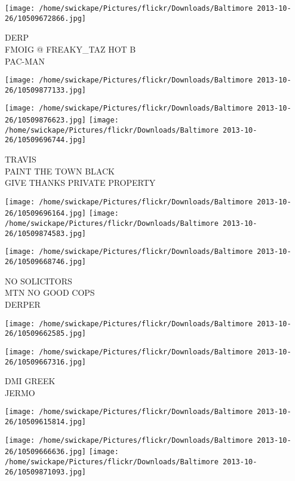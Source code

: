 \documentclass[10pt,letterpaper]{article}
\begin{document}
\vspace{0.25in}
\texttt{[image: /home/swickape/Pictures/flickr/Downloads/Baltimore 2013-10-26/10509672866.jpg]}

DERP\\
FMOIG @ FREAKY\_TAZ HOT B\\
PAC{-}MAN
\pagebreak

\texttt{[image: /home/swickape/Pictures/flickr/Downloads/Baltimore 2013-10-26/10509877133.jpg]}

\vspace{0.25in}
\texttt{[image: /home/swickape/Pictures/flickr/Downloads/Baltimore 2013-10-26/10509876623.jpg]}
\texttt{[image: /home/swickape/Pictures/flickr/Downloads/Baltimore 2013-10-26/10509696744.jpg]}

TRAVIS\\
PAINT THE TOWN BLACK\\
GIVE THANKS PRIVATE PROPERTY
\pagebreak

\texttt{[image: /home/swickape/Pictures/flickr/Downloads/Baltimore 2013-10-26/10509696164.jpg]}
\texttt{[image: /home/swickape/Pictures/flickr/Downloads/Baltimore 2013-10-26/10509874583.jpg]}

\texttt{[image: /home/swickape/Pictures/flickr/Downloads/Baltimore 2013-10-26/10509668746.jpg]}

NO SOLICITORS\\
MTN NO GOOD COPS\\
DERPER
\pagebreak

\texttt{[image: /home/swickape/Pictures/flickr/Downloads/Baltimore 2013-10-26/10509662585.jpg]}

\vspace{0.25in}
\texttt{[image: /home/swickape/Pictures/flickr/Downloads/Baltimore 2013-10-26/10509667316.jpg]}

DMI GREEK\\
JERMO
\pagebreak

\texttt{[image: /home/swickape/Pictures/flickr/Downloads/Baltimore 2013-10-26/10509615814.jpg]}

\vspace{0.25in}
\texttt{[image: /home/swickape/Pictures/flickr/Downloads/Baltimore 2013-10-26/10509666636.jpg]}
\texttt{[image: /home/swickape/Pictures/flickr/Downloads/Baltimore 2013-10-26/10509871093.jpg]}
\end{document}
